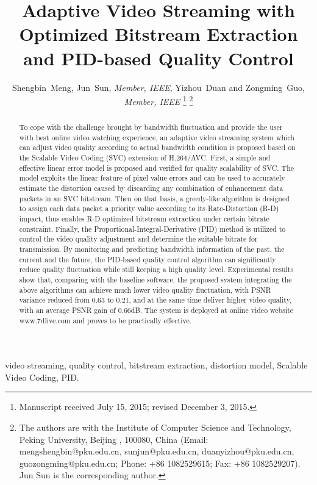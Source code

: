 \documentclass[journal]{IEEEtran}
\title{Adaptive Video Streaming with Optimized Bitstream Extraction and PID-based Quality Control}
\author{Shengbin~Meng, Jun~Sun, {\em Member, IEEE}, Yizhou~Duan and Zongming~Guo, {\em Member, IEEE} %
\thanks{Manuscript received July 15, 2015; revised December 3, 2015.}
\thanks{The authors are with the Institute of Computer Science and Technology, Peking University, Beijing%
, 100080, China (Email: mengshengbin@pku.edu.cn, sunjun@pku.edu.cn, duanyizhou@pku.edu.cn, guozongming@pku.edu.cn; Phone: +86 1082529615; Fax: +86 1082529207). Jun Sun is the corresponding author.}}
\begin{document}



\maketitle

\begin{abstract}
To cope with the challenge brought by bandwidth fluctuation and provide the user with best online video watching experience, an adaptive video streaming system which can adjust video quality according to actual bandwidth condition is proposed based on the Scalable Video Coding (SVC) extension of H.264/AVC. First, a simple and effective linear error model is proposed and verified for quality scalability of SVC. The model exploits the linear feature of pixel value errors and can be used to accurately estimate the distortion caused by discarding any combination of enhancement data packets in an SVC bitstream. Then on that basis, a greedy-like algorithm is designed to assign each data packet a priority value according to its Rate-Distortion (R-D) impact, thus enables R-D optimized bitstream extraction under certain bitrate constraint. Finally, the Proportional-Integral-Derivative (PID) method is utilized to control the video quality adjustment and determine the suitable bitrate for transmission. By monitoring and predicting bandwidth information of the past, the current and the future, the PID-based quality control algorithm can significantly reduce quality fluctuation while still keeping a high quality level. Experimental results show that, comparing with the baseline software, the proposed system integrating the above algorithms can achieve much lower video quality fluctuation, with PSNR variance reduced from 0.63 to 0.21, and at the same time deliver higher video quality, with an average PSNR gain of 0.66dB. The system is deployed at online video website www.7dlive.com and proves to be practically effective.
\end{abstract}

\begin{IEEEkeywords}
video streaming, quality control, bitstream extraction, distortion model, Scalable Video Coding, PID.
\end{IEEEkeywords}
\end{document}
